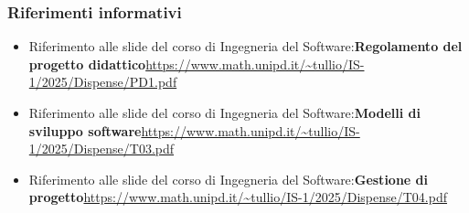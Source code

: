 \documentclass[a4paper,12pt]{article}
\begin{document}
{{        \subsubsection{Riferimenti informativi}{
            \begin{itemize}
                \item Riferimento alle slide del corso di Ingegneria del Software:\newline \textbf{Regolamento del progetto didattico}\newline \url{https://www.math.unipd.it/~tullio/IS-1/2025/Dispense/PD1.pdf}
                \item Riferimento alle slide del corso di Ingegneria del Software:\newline \textbf{Modelli di sviluppo software}\newline \url{https://www.math.unipd.it/~tullio/IS-1/2025/Dispense/T03.pdf}
                \item Riferimento alle slide del corso di Ingegneria del Software:\newline \textbf{Gestione di progetto}\newline \url{https://www.math.unipd.it/~tullio/IS-1/2025/Dispense/T04.pdf}
            \end{itemize}
        }
    }
}
\newpage
\end{document}
